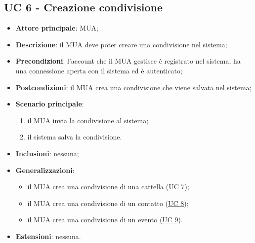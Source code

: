 \subsection{UC 6 - Creazione condivisione} \label{sec:UC6}
    \begin{itemize}
        \item \textbf{Attore principale}: MUA;
        \item \textbf{Descrizione}: il MUA deve poter creare una condivisione nel sistema;
        \item \textbf{Precondizioni}: l’account che il MUA gestisce è registrato nel sistema, ha una connessione aperta con il sistema ed è autenticato;
        \item \textbf{Postcondizioni}: il MUA crea una condivisione che viene salvata nel sistema;
        \item \textbf{Scenario principale}:
        \begin{enumerate}
            \item il MUA invia la condivisione al sistema;
            \item il sistema salva la condivisione.
        \end{enumerate}
    \item \textbf{Inclusioni}: nessuna;
    \item \textbf{Generalizzazioni}:
        \begin{itemize}
            \item il MUA crea una condivisione di una cartella (\hyperref[sec:UC7]{UC 7});
            \item il MUA crea una condivisione di un contatto (\hyperref[sec:UC8]{UC 8});
            \item il MUA crea una condivisione di un evento (\hyperref[sec:UC9]{UC 9}).
        \end{itemize}
    \item \textbf{Estensioni}: nessuna.
\end{itemize}
